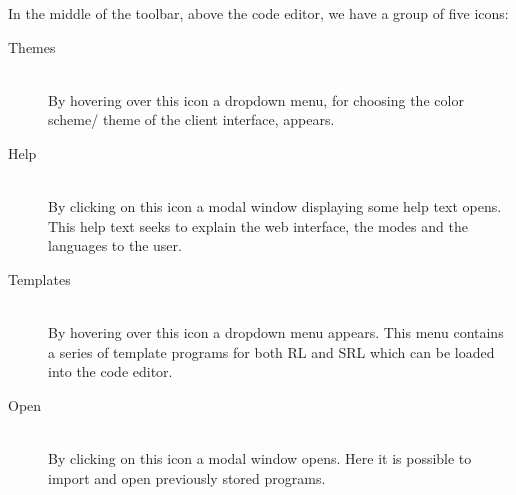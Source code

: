In the middle of the toolbar, above the code editor, we have a group of five icons:
\begin{description}

  \item[ Themes]~\\
    By hovering over this icon a dropdown menu, for choosing the color scheme/ theme of the client interface, appears. %

  \item[ Help]~\\
    By clicking on this icon a modal window displaying some help text opens. This help text seeks to explain the web interface, the modes and the languages to the user.

  \item[ Templates]~\\
    By hovering over this icon a dropdown menu appears. This menu contains a series of template programs for both RL and SRL which can be loaded into the code editor.

  \item[ Open]~\\
    By clicking on this icon a modal window opens. Here it is possible to import and open previously stored programs.


\end{description}
